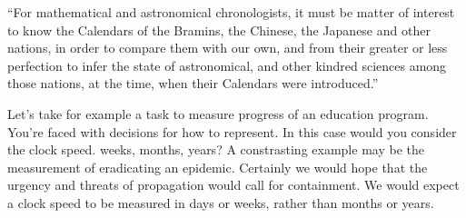 “For mathematical and astronomical chronologists, it must be matter of interest to know the Calendars of the Bramins, the Chinese, the Japanese and other nations, in order to compare them with our own, and from their greater or less perfection to infer the state of astronomical, and other kindred sciences among those nations, at the time, when their Calendars were
introduced.”

Let’s take for example a task to measure progress of an education program. You’re faced with decisions for how to represent. In this case would you consider the clock speed. weeks, months, years? A constrasting example may be the measurement of eradicating an epidemic. Certainly we would hope that the urgency and threats of propagation would call for containment. We would expect a clock speed to be measured in days or weeks, rather than months or years.
